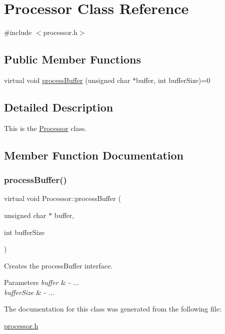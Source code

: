 \hypertarget{classProcessor}{}\section{Processor Class Reference}
\label{classProcessor}


{\ttfamily \#include $<$processor.\+h$>$}

\subsection*{Public Member Functions}
\begin{DoxyCompactItemize}
\item 
virtual void \hyperlink{classProcessor_a401e57b59e43de9c4a51ca0f566d2948}{process\+Buffer} (unsigned char $\ast$buffer, int buffer\+Size)=0
\end{DoxyCompactItemize}


\subsection{Detailed Description}
This is the \hyperlink{classProcessor}{Processor} class. 

\subsection{Member Function Documentation}
\mbox{\label{classProcessor_a401e57b59e43de9c4a51ca0f566d2948}} 
\subsubsection{\texorpdfstring{process\+Buffer()}{processBuffer()}}
{\footnotesize\ttfamily virtual void Processor\+::process\+Buffer (\begin{DoxyParamCaption}\item[{unsigned char $\ast$}]{buffer,  }\item[{int}]{buffer\+Size }\end{DoxyParamCaption})\hspace{0.3cm}{\ttfamily [pure virtual]}}

Creates the process\+Buffer interface. 
\begin{DoxyParams}{Parameters}
{\em buffer} & -\/ ... \\
\hline
{\em buffer\+Size} & -\/ ... \\
\hline
\end{DoxyParams}


The documentation for this class was generated from the following file\+:\begin{DoxyCompactItemize}
\item 
\hyperlink{processor_8h}{processor.\+h}\end{DoxyCompactItemize}
